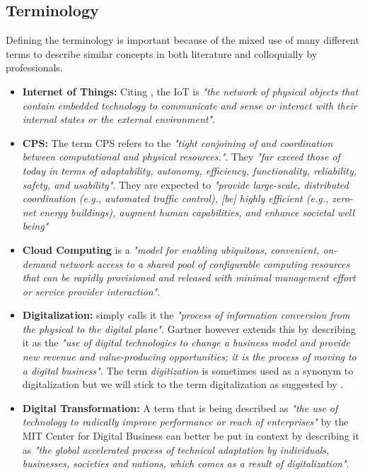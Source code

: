 \subsection{Terminology}
Defining the terminology is important because of the mixed use of many different terms to describe similar concepts in both literature and colloquially by professionals.

\begin{itemize}

\item \textbf{Internet of Things:} Citing \citeauthor{iot-def:2016}, the \ac{IoT} is \emph{"the network of physical objects that contain embedded technology to communicate and sense or interact with their internal states or the external environment"}.


  \item \textbf{\acl{CPS}:} The term \ac{CPS} refers to the \emph{"tight conjoining of and coordination between computational and physical resources."}. They \emph{"far exceed those of today in terms of adaptability, autonomy, efficiency, functionality, reliability, safety, and usability"}. They are expected to \emph{"provide large-scale, distributed coordination (e.g., automated traffic control), [be] highly efficient (e.g., zero-net energy buildings), augment human capabilities, and enhance societal well being"}  \cite{cps:nsf:2011}

  \item \textbf{Cloud Computing} is a \emph{"model for enabling ubiquitous, convenient, on-demand network access to a shared pool of configurable computing resources that can be rapidly provisioned and released with minimal management effort or service provider interaction"}\cite{Mell:2011:SND:2206223}.

  \item \textbf{Digitalization:} \citeauthor{khan-digital:2016} simply calls it the \emph{"process of information conversion from the physical to the digital plane"}. Gartner however extends this by describing it as the \emph{"use of digital technologies to change a business model and provide new revenue and value-producing opportunities; it is the process of moving to a digital business"}. The term \emph{digitization} is sometimes used as a synonym to digitalization but we will stick to the term digitalization as suggested by \citeauthor{khan-digital:2016}.

  \item \textbf{Digital Transformation:} A term that is being described as \emph{"the use of technology to radically improve performance or reach of enterprises"}\cite{westerman2011digital} by the MIT Center for Digital Business can better be put in context by describing it as \emph{"the global accelerated process of technical adaptation by individuals, businesses, societies and nations, which comes as a result of digitalization"}\cite{bonnect2014leading,khan-digital:2016}.


\end{itemize}
